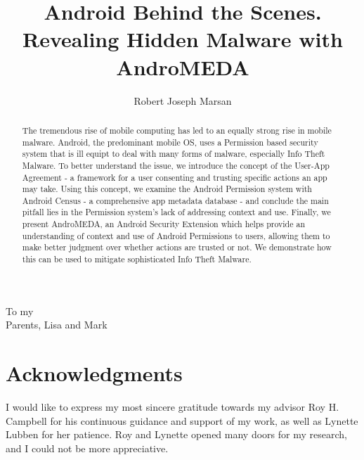 \documentclass[edeposit,10pt,fullpage]{uiucthesis2009}
\begin{document}
\title{Android Behind the Scenes. Revealing Hidden Malware with AndroMEDA}
\author{Robert Joseph Marsan}
\msthesis
{}
\maketitle

\frontmatter

\begin{abstract}
The tremendous rise of mobile computing has led to an equally strong rise in mobile malware. Android, the predominant mobile OS, uses a Permission based security system that is ill equipt to deal with many forms of malware, especially Info Theft Malware. To better understand the issue, we introduce the concept of the User-App Agreement - a framework for a user consenting and trusting specific actions an app may take. Using this concept, we examine the Android Permission system with Android Census - a comprehensive app metadata database - and conclude the main pitfall lies in the Permission system's lack of addressing context and use. Finally, we present AndroMEDA, an Android Security Extension which helps provide an understanding of context and use of Android Permissions to users, allowing them to make better judgment over whether actions are trusted or not. We demonstrate how this can be used to mitigate sophisticated Info Theft Malware.

\end{abstract}

\begin{dedication}
To my\\
Parents, Lisa and Mark
\end{dedication}

\chapter*{Acknowledgments}

I would like to express my most sincere gratitude towards my advisor Roy H. Campbell for his continuous guidance and support of my work, as well as Lynette Lubben for her patience. Roy and Lynette opened many doors for my research, and I could not be more appreciative.
\end{document}
